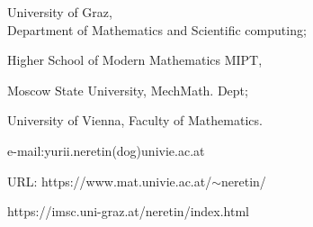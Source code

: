 \documentclass[]{amsart}
\def\sm{\smallskip}
\begin{document}
\tt 

University of Graz,
\\
\phantom{.}
\hfill Department of Mathematics and Scientific computing;

Higher School of Modern Mathematics MIPT,


Moscow State University, MechMath. Dept;

 University of Vienna, Faculty of Mathematics.
 
 \sm

e-mail:yurii.neretin(dog)univie.ac.at

URL: https://www.mat.univie.ac.at/$\sim$neretin/ 

\phantom{URL:} https://imsc.uni-graz.at/neretin/index.html
 
             
        
\end{document}
